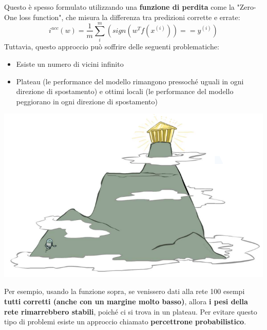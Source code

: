 \documentclass[12pt]{article}
\begin{document}
Questo è spesso formulato utilizzando una \textbf{funzione di perdita} come la "Zero-One loss function", che misura la differenza tra predizioni corrette e errate:
$$i^{acc}(w) = \frac{1}{m} \sum_{i}^{m}(sign(w^T f(x^{(i)})) == y^{(i)})$$
Tuttavia, questo approccio può soffrire delle seguenti problematiche:
\begin{itemize}
    \item Esiste un numero di vicini infinito
    \item Plateau (le performance del modello rimangono pressoché uguali in ogni direzione di spostamento) e ottimi locali (le performance del modello peggiorano in ogni direzione di spostamento)
\end{itemize}
\begin{center}
    \includegraphics[width =0.70\linewidth]{Images/111.PNG}
\end{center}
Per esempio, usando la funzione sopra, se venissero dati alla rete 100 esempi \textbf{tutti corretti (anche con un margine molto basso)}, allora \textbf{i pesi della rete rimarrebbero stabili}, poiché ci si trova in un
plateau. Per evitare questo tipo di problemi esiste un approccio chiamato \textbf{percettrone probabilistico}.
\end{document}
